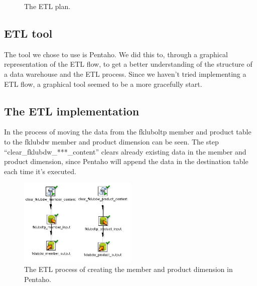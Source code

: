 \begin{figure}[H]
    \caption{The ETL plan.}
    \label{fig:etl-plan}
\end{figure}

\subsection{ETL tool}
The tool we chose to use is Pentaho.
We did this to, through a graphical representation of the ETL flow, to get a better understanding of the structure of a data warehouse and the ETL process.
Since we haven't tried implementing a ETL flow, a graphical tool seemed to be a more gracefully start. 

\subsection{The ETL implementation}
In  the process of moving the data from the fkluboltp member and product table to the fklubdw member and product dimension can be seen.
The step ``clear\_fklubdw\_***\_content'' clears already existing data in the member and product dimension, since Pentaho will append the data in the destination table each time it's executed. 

\begin{figure}[H]
    \centering
    \includegraphics[width=0.5\textwidth]{img/product_memb_dim.png}
    \caption{The ETL process of creating the member and product dimension in Pentaho.}
    \label{fig:etl-process1}
\end{figure}

